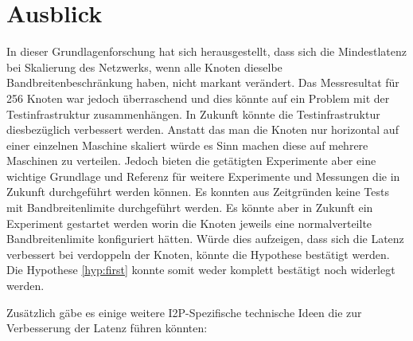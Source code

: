 \chapter{Ausblick}\label{ch:Ausblick}

In dieser Grundlagenforschung hat sich herausgestellt,
dass sich die Mindestlatenz bei Skalierung des Netzwerks,
wenn alle Knoten dieselbe Bandbreitenbeschränkung haben,
nicht markant verändert.
Das Messresultat für 256 Knoten war jedoch überraschend und dies könnte auf ein Problem mit der Testinfrastruktur zusammenhängen.
In Zukunft könnte die Testinfrastruktur diesbezüglich verbessert werden.
Anstatt das man die Knoten nur horizontal auf einer einzelnen Maschine skaliert würde es Sinn machen diese auf mehrere Maschinen zu verteilen.
Jedoch bieten die getätigten Experimente aber eine wichtige Grundlage und Referenz für weitere Experimente und Messungen die in Zukunft durchgeführt werden können.
Es konnten aus Zeitgründen keine Tests mit Bandbreitenlimite durchgeführt werden.
Es könnte aber in Zukunft ein Experiment gestartet werden worin die Knoten jeweils eine normalverteilte Bandbreitenlimite konfiguriert hätten. 
Würde dies aufzeigen, dass sich die Latenz verbessert bei verdoppeln der Knoten, könnte die Hypothese bestätigt werden.
Die Hypothese \ref{hyp:first} konnte somit weder komplett bestätigt noch widerlegt werden.

Zusätzlich gäbe es einige weitere I2P-Spezifische technische Ideen die zur Verbesserung der Latenz führen könnten:


